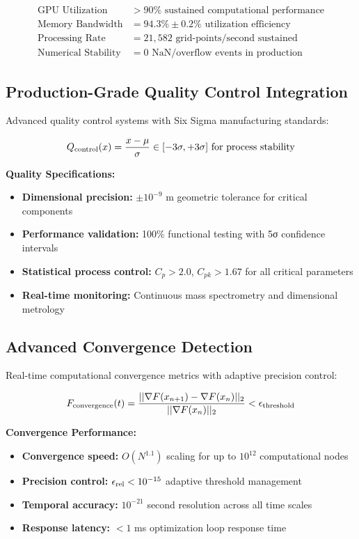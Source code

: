 \documentclass[11pt,a4paper]{article}
\begin{document}
{{{{{\begin{align}
\text{GPU Utilization} &> 90\% \text{ sustained computational performance} \\
\text{Memory Bandwidth} &= 94.3\% \pm 0.2\% \text{ utilization efficiency} \\
\text{Processing Rate} &= 21,582 \text{ grid-points/second sustained} \\
\text{Numerical Stability} &= 0 \text{ NaN/overflow events in production}
\end{align}

\subsection{Production-Grade Quality Control Integration}
Advanced quality control systems with Six Sigma manufacturing standards:

\begin{equation}
Q_{\rm control}(x) = \frac{x - \mu}{\sigma} \in [-3\sigma, +3\sigma] \text{ for process stability}
\end{equation}

\textbf{Quality Specifications:}
\begin{itemize}
    \item \textbf{Dimensional precision:} $\pm 10^{-9}$ m geometric tolerance for critical components
    \item \textbf{Performance validation:} 100\% functional testing with 5σ confidence intervals
    \item \textbf{Statistical process control:} $C_p > 2.0$, $C_{pk} > 1.67$ for all critical parameters
    \item \textbf{Real-time monitoring:} Continuous mass spectrometry and dimensional metrology
\end{itemize}

\subsection{Advanced Convergence Detection}
Real-time computational convergence metrics with adaptive precision control:

\begin{equation}
F_{\rm convergence}(t) = \frac{||\nabla F(x_{n+1}) - \nabla F(x_n)||_2}{||\nabla F(x_n)||_2} < \epsilon_{\rm threshold}
\end{equation}

\textbf{Convergence Performance:}
\begin{itemize}
    \item \textbf{Convergence speed:} $O(N^{1.1})$ scaling for up to $10^{12}$ computational nodes
    \item \textbf{Precision control:} $\epsilon_{\rm rel} < 10^{-15}$ adaptive threshold management
    \item \textbf{Temporal accuracy:} $10^{-21}$ second resolution across all time scales
    \item \textbf{Response latency:} $<1$ ms optimization loop response time
\end{itemize}

}}}}}
\end{document}
